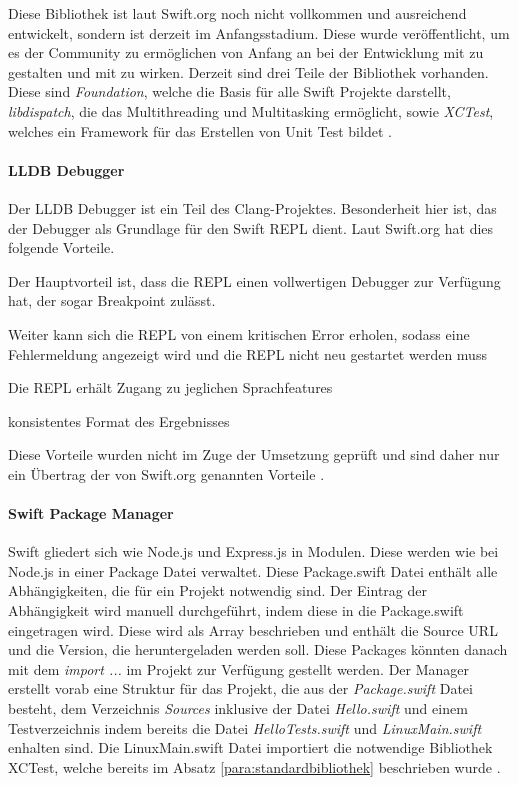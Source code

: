 Diese Bibliothek ist laut Swift.org noch nicht vollkommen und ausreichend entwickelt, sondern ist derzeit im Anfangsstadium. Diese wurde veröffentlicht, um es der Community zu ermöglichen von Anfang an bei der Entwicklung mit zu gestalten und mit zu wirken.  Derzeit sind drei Teile der Bibliothek vorhanden. Diese sind \textit{Foundation}, welche die Basis für alle Swift Projekte darstellt, \textit{libdispatch}, die das Multithreading und Multitasking ermöglicht, sowie \textit{XCTest}, welches ein Framework für das Erstellen von Unit Test bildet \parencite{swiftcore}.

\paragraph{LLDB Debugger}
Der LLDB Debugger ist ein Teil des Clang-Projektes. Besonderheit hier ist, das der Debugger als Grundlage für den Swift REPL dient. Laut Swift.org hat dies folgende Vorteile.
\begin{compactenum}[a)]
\item Der Hauptvorteil ist, dass die REPL einen vollwertigen Debugger zur Verfügung hat, der sogar Breakpoint zulässt.
\item Weiter kann sich die REPL von einem kritischen Error erholen, sodass eine Fehlermeldung angezeigt wird und die REPL nicht neu gestartet werden muss
\item Die REPL erhält Zugang zu jeglichen Sprachfeatures
\item konsistentes Format des Ergebnisses
\end{compactenum}

Diese Vorteile wurden nicht im Zuge der Umsetzung geprüft und sind daher nur ein Übertrag der von Swift.org genannten Vorteile \parencite{swiftdebugger}.

\paragraph{Swift Package Manager}
Swift gliedert sich wie Node.js und Express.js in Modulen. Diese werden wie bei Node.js in einer Package Datei verwaltet. Diese Package.swift Datei enthält alle Abhängigkeiten, die für ein Projekt notwendig sind. Der Eintrag der Abhängigkeit wird manuell durchgeführt, indem diese in die Package.swift eingetragen wird. Diese wird als Array beschrieben und enthält die Source URL und die Version, die heruntergeladen werden soll. Diese Packages könnten danach mit dem \textit{import ...} im Projekt zur Verfügung gestellt werden.
Der Manager erstellt vorab eine Struktur für das Projekt, die aus der \textit{Package.swift} Datei besteht, dem Verzeichnis \textit{Sources} inklusive der Datei \textit{Hello.swift} und einem Testverzeichnis indem bereits die Datei \textit{HelloTests.swift} und \textit{LinuxMain.swift} enhalten sind. Die LinuxMain.swift Datei importiert die notwendige Bibliothek XCTest, welche bereits im Absatz \ref{para:standardbibliothek} beschrieben wurde \parencite{swiftpm}.

